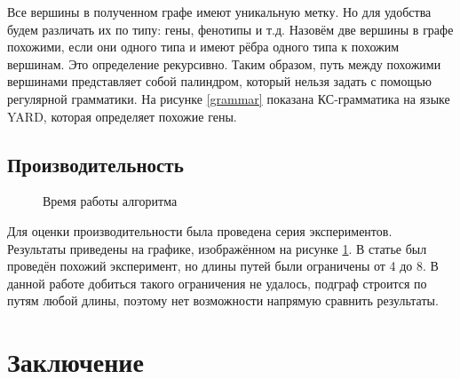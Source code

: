 \documentclass[14pt]{matmex-diploma}
\begin{document}
Все вершины в полученном графе имеют уникальную метку. Но для удобства будем различать их по типу: гены, фенотипы и т.д. Назовём две вершины в графе похожими, если они одного типа и имеют рёбра одного типа к похожим вершинам. Это определение рекурсивно. Таким образом, путь между похожими вершинами представляет собой палиндром, который нельзя задать с помощью регулярной грамматики. На рисунке \ref{grammar} показана КС-грамматика на языке YARD, которая определяет похожие гены.  
\subsection{Производительность}

\begin{figure}
\begin{center}
\end{center}
\caption{Время работы алгоритма}
\label{time}
\end{figure}

Для оценки производительности была проведена серия экспериментов. Результаты приведены на графике, изображённом на рисунке \ref{time}. В статье \cite{subgraph} был проведён похожий эксперимент, но длины путей были ограничены от 4 до 8. В данной работе добиться такого ограничения не удалось, подграф строится по путям любой длины, поэтому нет возможности напрямую сравнить результаты.

\section{Заключение}

\setmonofont[Mapping=tex-text]{CMU Typewriter Text}


\end{document}
